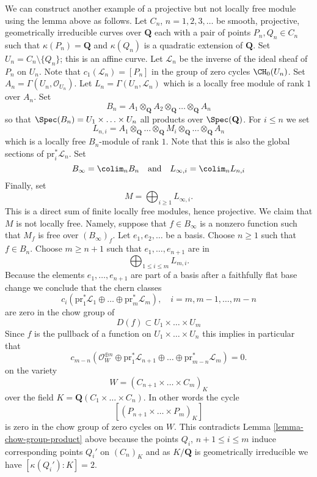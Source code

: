 \noindent
We can construct another example of a projective but not locally free
module using the lemma above as follows. Let
$C_n$, $n = 1, 2, 3, \ldots$ be smooth, projective, geometrically irreducible
curves over $\mathbf{Q}$ each with a pair of points
$P_n, Q_n \in C_n$ such that $\kappa(P_n) = \mathbf{Q}$ and
$\kappa(Q_n)$ is a quadratic extension of $\mathbf{Q}$.
Set $U_n = C_n \setminus \{Q_n\}$; this is an affine curve.
Let $\mathcal{L}_n$ be the inverse of the ideal sheaf of $P_n$
on $U_n$. Note that $c_1(\mathcal{L}_n) = [P_n]$ in the group of
zero cycles $\CH_0(U_n)$. Set $A_n = \Gamma(U_n, \mathcal{O}_{U_n})$.
Let $L_n = \Gamma(U_n, \mathcal{L}_n)$ which is a locally
free module of rank $1$ over $A_n$. Set
$$
B_n = A_1 \otimes_{\mathbf{Q}} A_2 \otimes_{\mathbf{Q}} \ldots
\otimes_{\mathbf{Q}} A_n
$$
so that $\Spec(B_n) = U_1 \times \ldots \times U_n$ all products
over $\Spec(\mathbf{Q})$. For $i \leq n$ we set
$$
L_{n, i} =
A_1 \otimes_{\mathbf{Q}} \ldots \otimes_{\mathbf{Q}} M_i
\otimes_{\mathbf{Q}} \ldots \otimes_{\mathbf{Q}} A_n
$$
which is a locally free $B_n$-module of rank $1$. Note that this is
also the global sections of $\text{pr}_i^*\mathcal{L}_n$. Set
$$
B_\infty = \colim_n B_n
\quad\text{and}\quad
L_{\infty, i} = \colim_n L_{n, i}
$$
Finally, set
$$
M = \bigoplus\nolimits_{i \geq 1} L_{\infty, i}.
$$
This is a direct sum of finite locally free modules, hence projective.
We claim that $M$ is not locally free. Namely, suppose that
$f \in B_\infty$ is a nonzero function such that $M_f$ is free
over $(B_\infty)_f$. Let $e_1, e_2, \ldots$ be a basis. Choose
$n \geq 1$ such that $f \in B_n$.
Choose $m \geq n + 1$ such that $e_1, \ldots, e_{n + 1}$ are in
$$
\bigoplus\nolimits_{1 \leq i \leq m} L_{m, i}.
$$
Because the elements $e_1, \ldots, e_{n + 1}$ are part of a basis
after a faithfully flat base change we conclude that
the chern classes
$$
c_i(\text{pr}_1^*\mathcal{L}_1 \oplus \ldots \oplus
\text{pr}_m^*\mathcal{L}_m), \quad i = m, m - 1, \ldots, m - n
$$
are zero in the chow group of
$$
D(f) \subset U_1 \times \ldots \times U_m
$$
Since $f$ is the pullback of a function on $U_1 \times \ldots \times U_n$
this implies in particular that
$$
c_{m - n}(\mathcal{O}_W^{\oplus n} \oplus
\text{pr}_1^*\mathcal{L}_{n + 1} \oplus \ldots
\oplus \text{pr}_{m - n}^*\mathcal{L}_m) = 0.
$$
on the variety
$$
W = (C_{n + 1} \times \ldots \times C_m)_K
$$
over the field $K = \mathbf{Q}(C_1 \times \ldots \times C_n)$.
In other words the cycle
$$
[(P_{n + 1} \times \ldots \times P_m)_K]
$$
is zero in the chow group of zero cycles on $W$. This contradicts
Lemma \ref{lemma-chow-group-product}
above because the points $Q_i$, $n + 1 \leq i \leq m$
induce corresponding points $Q_i'$ on $(C_n)_K$ and as $K/\mathbf{Q}$
is geometrically irreducible we have $[\kappa(Q_i') : K] = 2$.

